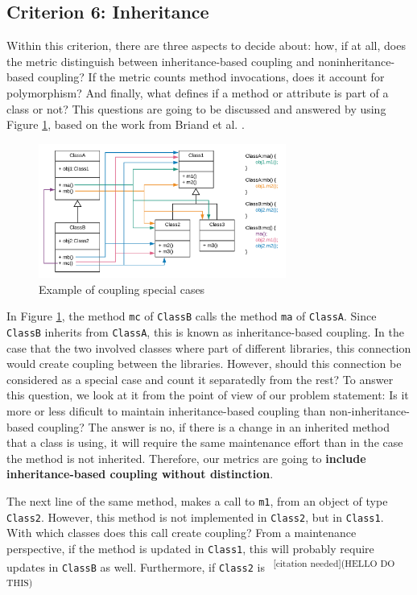 \documentclass[a4paper]{article}
\newcommand{\cn}[1]{\textsuperscript{\color{red} ~[citation needed](#1)~}}
\begin{document}
\subsection{Criterion 6: Inheritance}
Within this criterion, there are three aspects to decide about: how, if at all, does the metric distinguish between inheritance-based coupling and noninheritance-based coupling? If the metric counts method invocations, does it account for polymorphism? And finally, what defines if a method or attribute is part of a class or not? This questions are going to be discussed and answered by using Figure \ref{fig:specialcases}, based on the work from Briand et al. \cite{briand1999unified}.

\begin{figure}[ht]
\begin{center}
\includegraphics[height=4.4cm]{img/specialcases.png}
\caption{Example of coupling special cases}
\label{fig:specialcases}
\end{center}
\end{figure}

In Figure \ref{fig:specialcases}, the method \texttt{mc} of \texttt{ClassB} calls the method \texttt{ma} of \texttt{ClassA}. Since \texttt{ClassB} inherits from \texttt{ClassA}, this is known as inheritance-based coupling. In the case that the two involved classes where part of different libraries, this connection would create coupling between the libraries. However, should this connection be considered as a special case and count it separatedly from the rest? To answer this question, we look at it from the point of view of our problem statement: Is it more or less dificult to maintain inheritance-based coupling than non-inheritance-based coupling? The answer is no, if there is a change in an inherited method that a class is using, it will require the same maintenance effort than in the case the method is not inherited. Therefore, our metrics are going to \textbf{include inheritance-based coupling without distinction}.

The next line of the same method, makes a call to \texttt{m1}, from an object of type \texttt{Class2}. However, this method is not implemented in \texttt{Class2}, but in \texttt{Class1}. With which classes does this call create coupling? From a maintenance perspective, if the method is updated in \texttt{Class1}, this will probably require updates in \texttt{ClassB} as well. Furthermore, if \texttt{Class2} is \cn{HELLO DO THIS}
\end{document}
